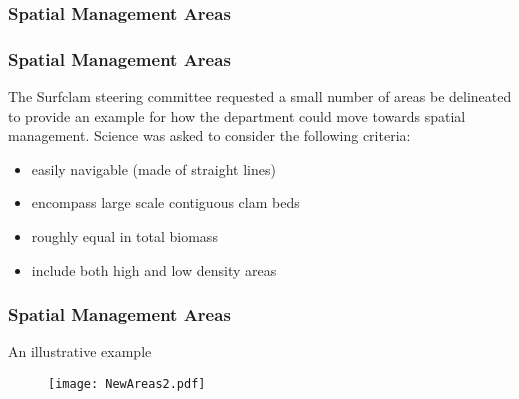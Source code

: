 \documentclass{beamer}
\begin{document}
\frametitle{Spatial Management Areas}
\begin{frame}
\frametitle{Spatial Management Areas}
The Surfclam steering committee requested a small number of areas be delineated to provide an example for how the department could move towards spatial management. Science was asked to consider the following criteria:

\begin{itemize}
    \item easily navigable (made of straight lines)
    \item encompass large scale contiguous clam beds
    \item roughly equal in total biomass
    \item include both high and low density areas
\end{itemize}


\end{frame}


\begin{frame}
\frametitle{Spatial Management Areas}
An illustrative example

\begin{figure}
        \begin{center}
            \texttt{[image: NewAreas2.pdf]}
        \end{center}
    \end{figure}


\end{frame}
\end{document}
